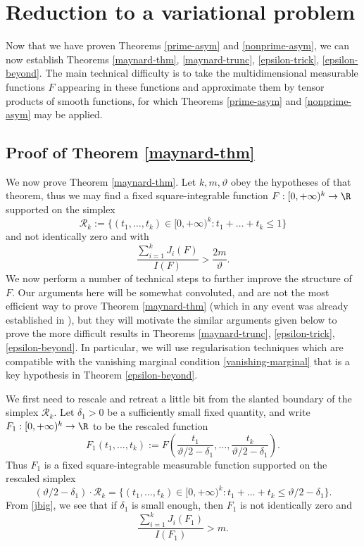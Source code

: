 \section{Reduction to a variational problem}\label{variational-sec}

Now that we have proven Theorems \ref{prime-asym} and \ref{nonprime-asym}, we can now establish Theorems \ref{maynard-thm}, \ref{maynard-trunc}, \ref{epsilon-trick}, \ref{epsilon-beyond}.  The main technical difficulty is to take the multidimensional measurable functions $F$ appearing in these functions and approximate them by tensor products of smooth functions, for which Theorems \ref{prime-asym} and \ref{nonprime-asym} may be applied.

\subsection{Proof of Theorem \ref{maynard-thm}}\label{may-sec}

We now prove Theorem \ref{maynard-thm}.  Let $k, m, \vartheta$ obey the hypotheses of that theorem, thus we may find a fixed square-integrable function $F: [0,+\infty)^k \to \R$ supported on the simplex
$$ {\mathcal R}_k := \{ (t_1,\dots,t_k) \in [0,+\infty)^k: t_1+\dots+t_k \leq 1 \}$$
and not identically zero and with
\begin{equation}\label{jbig}
 \frac{\sum_{i=1}^k J_i(F)}{I(F)} > \frac{2m}{\vartheta}.
\end{equation}
We now perform a number of technical steps to further improve the structure of $F$.  Our arguments here will be somewhat convoluted, and are not the most efficient way to prove Theorem \ref{maynard-thm} (which in any event was already established in \cite{maynard-new}), but they will motivate the similar arguments given below to prove the more difficult results in Theorems \ref{maynard-trunc}, \ref{epsilon-trick}, \ref{epsilon-beyond}.  In particular, we will use regularisation techniques which are compatible with the vanishing marginal condition \eqref{vanishing-marginal} that is a key hypothesis in Theorem \ref{epsilon-beyond}.

We first need to rescale and retreat a little bit from the slanted boundary of the simplex ${\mathcal R}_k$.
Let $\delta_1 > 0$ be a sufficiently small fixed quantity, and write $F_1: [0,+\infty)^k \to \R$ to be the rescaled function
$$ F_1(t_1,\dots,t_k) := F( \frac{t_1}{\vartheta/2-\delta_1}, \dots, \frac{t_k}{\vartheta/2-\delta_1} ).$$
Thus $F_1$ is a fixed square-integrable measurable function supported on the rescaled simplex
$$ (\vartheta/2-\delta_1) \cdot {\mathcal R}_k = \{ (t_1,\dots,t_k) \in [0,+\infty)^k: t_1+\dots+t_k \leq \vartheta/2-\delta_1 \}.$$
From \eqref{jbig}, we see that if $\delta_1$ is small enough, then $F_1$ is not identically zero and
\begin{equation}\label{jbig-2}
 \frac{\sum_{i=1}^k J_i(F_1)}{I(F_1)} > m.
\end{equation}

